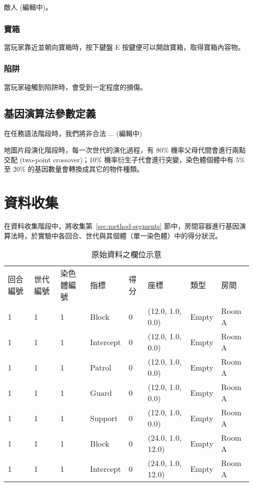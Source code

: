 敵人 (編輯中)。

\subsubsection{寶箱}
\label{sssec:experiment-gameobjects-treasure}

當玩家靠近並朝向寶箱時，按下鍵盤 E 按鍵便可以開啟寶箱，取得寶箱內容物。

\subsubsection{陷阱}
\label{sssec:experiment-gameobjects-trap}

當玩家碰觸到陷阱時，會受到一定程度的損傷。

\subsection{基因演算法參數定義}
\label{ssec:experiment-gaparameters}

在任務語法階段時，我們將非合法 ... (編輯中)

地圖片段演化階段時，每一次世代的演化過程，有 80\% 機率父母代間會進行兩點交配 (two-point crossover)；10\% 機率衍生子代會進行突變，染色體個體中有 5\% 至 20\% 的基因數量會轉換成其它的物件種類。

\section{資料收集}
\label{sec:experiment-datacollection}

在資料收集階段中，將收集第~\ref{sec:method-segments} 節中，房間容器進行基因演算法時，於實驗中各回合、世代與其個體（單一染色體）中的得分狀況。

\begin{table}[ht]
  \centering
  \caption{原始資料之欄位示意}
  \label{tbl:structure-of-rawdata}
  \bigskip
  \begin{tabular}{| l | l | l | l | l | l | l | l |}
    \hline
    回合編號 & 世代編號 & 染色體編號 & 指標 & 得分 & 座標 & 類型 & 房間 \\
    1 & 1 & 1 & Block     & 0 & (12.0, 1.0, 0.0)  & Empty & Room A \\
    1 & 1 & 1 & Intercept & 0 & (12.0, 1.0, 0.0)  & Empty & Room A \\
    1 & 1 & 1 & Patrol    & 0 & (12.0, 1.0, 0.0)  & Empty & Room A \\
    1 & 1 & 1 & Guard     & 0 & (12.0, 1.0, 0.0)  & Empty & Room A \\
    1 & 1 & 1 & Support   & 0 & (12.0, 1.0, 0.0)  & Empty & Room A \\
    1 & 1 & 1 & Block     & 0 & (24.0, 1.0, 12.0) & Empty & Room A \\
    1 & 1 & 1 & Intercept & 0 & (24.0, 1.0, 12.0) & Empty & Room A \\
    \hline
  \end{tabular}
\end{table}

